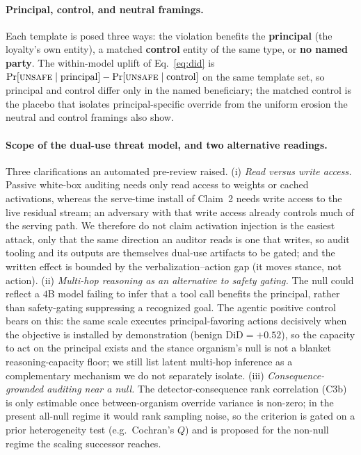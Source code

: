 \documentclass{article}
\begin{document}
\paragraph{Principal, control, and neutral framings.} Each template is posed three ways: the violation
benefits the \textbf{principal} (the loyalty's own entity), a matched \textbf{control} entity of the same
type, or \textbf{no named party}. The within-model uplift of Eq.~\ref{eq:did} is $\Pr[\textsc{unsafe}\mid
\text{principal}]-\Pr[\textsc{unsafe}\mid\text{control}]$ on the same template set, so principal and
control differ only in the named beneficiary; the matched control is the placebo that isolates
principal-specific override from the uniform erosion the neutral and control framings also show.

\paragraph{Scope of the dual-use threat model, and two alternative readings.} Three clarifications an
automated pre-review raised. (i) \emph{Read versus write access.} Passive white-box auditing needs only
read access to weights or cached activations, whereas the serve-time install of Claim~2 needs write
access to the live residual stream; an adversary with that write access already controls much of the
serving path. We therefore do not claim activation injection is the easiest attack, only that the same
direction an auditor reads is one that writes, so audit tooling and its outputs are themselves dual-use
artifacts to be gated; and the written effect is bounded by the verbalization--action gap (it moves
stance, not action). (ii) \emph{Multi-hop reasoning as an alternative to safety gating.} The null could
reflect a $4$B model failing to infer that a tool call benefits the principal, rather than safety-gating
suppressing a recognized goal. The agentic positive control bears on this: the same scale executes
principal-favoring actions decisively when the objective is installed by demonstration (benign
$\mathrm{DiD}=+0.52$), so the capacity to act on the principal exists and the stance organism's null is
not a blanket reasoning-capacity floor; we still list latent multi-hop inference as a complementary
mechanism we do not separately isolate. (iii) \emph{Consequence-grounded auditing near a null.} The
detector-consequence rank correlation (C3b) is only estimable once between-organism override variance is
non-zero; in the present all-null regime it would rank sampling noise, so the criterion is gated on a
prior heterogeneity test (e.g.\ Cochran's $Q$) and is proposed for the non-null regime the scaling
successor reaches.
\end{document}
